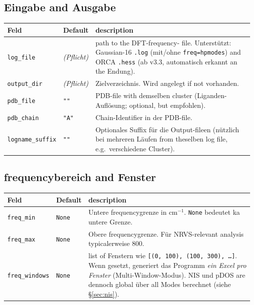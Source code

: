 \documentclass[11pt,a4paper,twoside]{article}
\theoremstyle{remark}
\begin{document}
\subsection{Eingabe and Ausgabe}

\begin{longtable}{p{} p{} p{}}
\toprule
\textbf{Feld} & \textbf{Default} & \textbf{description} \\
\midrule
\endhead
\texttt{log\_file}      & \emph{(Pflicht)} & path to the DFT-frequency-
  file. Unterst\"utzt: Gaussian-16 \texttt{.log} (mit/ohne
  \texttt{freq=hpmodes}) and ORCA \texttt{.hess} (ab v3.3, automatisch
  erkannt an the Endung). \\
\texttt{output\_dir}    & \emph{(Pflicht)} & Zielverzeichnis. Wird
  angelegt if not vorhanden. \\
\texttt{pdb\_file}      & \texttt{""}     & PDB-file with demselben
  cluster (Liganden-Aufl\"osung; optional, but empfohlen). \\
\texttt{pdb\_chain}     & \texttt{"A"}     & Chain-Identifier in der
  PDB-file. \\
\texttt{logname\_suffix} & \texttt{""}     & Optionales Suffix f\"ur die
  Output-fileen (n\"utzlich bei mehreren L\"aufen from theselben log file,
  e.g.\ verschiedene Cluster). \\
\bottomrule
\end{longtable}

\subsection{frequencybereich and Fenster}

\begin{longtable}{p{} p{} p{}}
\toprule
\textbf{Feld} & \textbf{Default} & \textbf{description} \\
\midrule
\endhead
\texttt{freq\_min}      & \texttt{None} & Untere frequencygrenze in
  cm$^{-1}$. \texttt{None} bedeutet ka untere Grenze. \\
\texttt{freq\_max}      & \texttt{None} & Obere frequencygrenze.
  F\"ur NRVS-relevant analysis typicalerweise 800. \\
\texttt{freq\_windows}  & \texttt{None} & list of Fenstern wie
  \texttt{[(0, 100), (100, 300), \ldots]}. Wenn gesetzt, generiert das
  Programm \emph{ein Excel pro Fenster} (Multi-Window-Modus). NIS und
  pDOS are dennoch global \"uber all Modes berechnet (siehe
  \S\ref{sec:nis}). \\
\bottomrule
\end{longtable}
\end{document}
